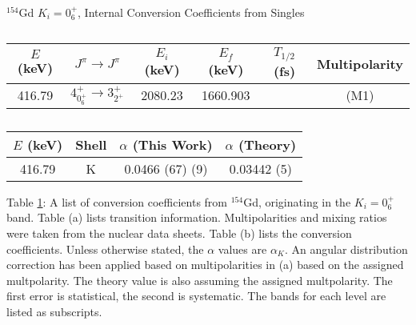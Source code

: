 \begin{table}
    \centering
    \caption{$^{154}$Gd $K_i=0^+_6$, Internal Conversion Coefficients from Singles}
    \label{tab:154Gd_Single_06_Disc}
\begin{ThreePartTable}
    \begin{subtable}{\textwidth}
        \caption{}
    \begin{tabular}{c|c|c|c|c|c}
        \toprule
        $E$ (keV)	&	$J^{\pi}	\rightarrow	J^{\pi}$	&	$E_i$ (keV)	&	$E_f$ (keV)	&	$T_{1/2}$ (fs)	&	Multipolarity	\\
        \hline
        416.79	&	$4^+_{0^+_6}	\rightarrow	3^+_{2^+}$	&	2080.23	&	1660.903	&		&	(M1)	\\
        \bottomrule
    \end{tabular}
    \end{subtable}
    \end{ThreePartTable}
\end{table}
\begin{table}
    \ContinuedFloat
    \begin{subtable}{\textwidth}
    \end{subtable}
    \begin{ThreePartTable}
    \begin{subtable}{\textwidth}
        \caption{}
        \begin{tabular}{c|c|c|c}
            \toprule
            $E$ (keV) & Shell &	$\alpha$ (This Work)	&	$\alpha$  (Theory)\citep{kibedi08:_BRICC}\\
            \hline
            416.79	 & K &	0.0466	(67) (9)	&	0.03442 (5)	\\
            \bottomrule
        \end{tabular}
        \end{subtable}

        \makeatletter\def\TPT@hsize{}\makeatletter

        \begin{tablenotes}[para]
            Table \ref{tab:154Gd_Single_06_Disc}: A list of conversion coefficients from $^{154}$Gd, originating in the $K_i=0^+_6$ band. Table (a) lists transition information. Multipolarities and mixing ratios were taken from the nuclear data sheets\citep{reich09:_nds_154}. Table (b) lists the conversion coefficients. Unless otherwise stated, the $\alpha$ values are $\alpha_K$. An angular distribution correction has been applied based on multipolarities in (a) based on the assigned multpolarity. The theory value is also assuming the assigned multpolarity. The first error is statistical, the second is systematic. The bands for each level are listed as subscripts.
        \end{tablenotes}
\end{ThreePartTable}
\end{table}
